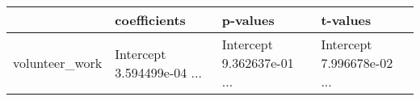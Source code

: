 \begin{tabular}{llll}
\toprule
{} &                                       coefficients &                                           p-values &                                           t-values \\
\midrule
volunteer\_work &  Intercept                        3.594499e-04
... &  Intercept                        9.362637e-01
... &  Intercept                        7.996678e-02
... \\
\bottomrule
\end{tabular}
